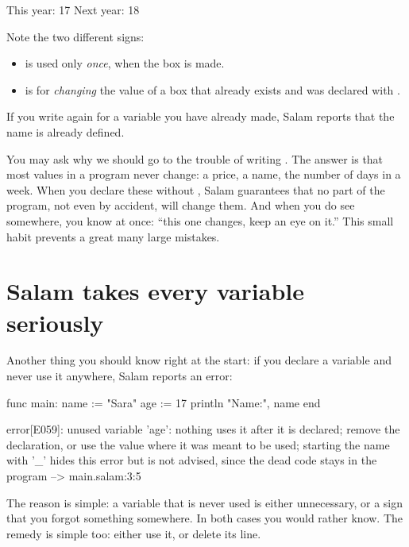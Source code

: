 \begin{salamout}
This year: 17
Next year: 18
\end{salamout}

Note the two different signs:
\begin{itemize}
  \item \code{:=} is used only \emph{once}, when the box is made.
  \item \code{=} is for \emph{changing} the value of a box that already
        exists and was declared with .
\end{itemize}
If you write \code{:=} again for a variable you have already made, Salam
reports that the name is already defined.

\begin{note}
You may ask why we should go to the trouble of writing . The
answer is that most values in a program never change: a price, a name, the
number of days in a week. When you declare these without , Salam
guarantees that no part of the program, not even by accident, will change
them. And when you do see  somewhere, you know at once: ``this one
changes, keep an eye on it.'' This small habit prevents a great many large
mistakes.
\end{note}

\section{Salam takes every variable seriously}

Another thing you should know right at the start: if you declare a variable
and never use it anywhere, Salam reports an error:

\begin{salamcode}
func main:
    name := "Sara"
    age := 17
    println "Name:", name
end
\end{salamcode}

\begin{salamout}
error[E059]: unused variable 'age': nothing uses it after it is
declared; remove the declaration, or use the value where it was
meant to be used; starting the name with '_' hides this error but
is not advised, since the dead code stays in the program
 --> main.salam:3:5
\end{salamout}

The reason is simple: a variable that is never used is either unnecessary,
or a sign that you forgot something somewhere. In both cases you would
rather know. The remedy is simple too: either use it, or delete its line.

